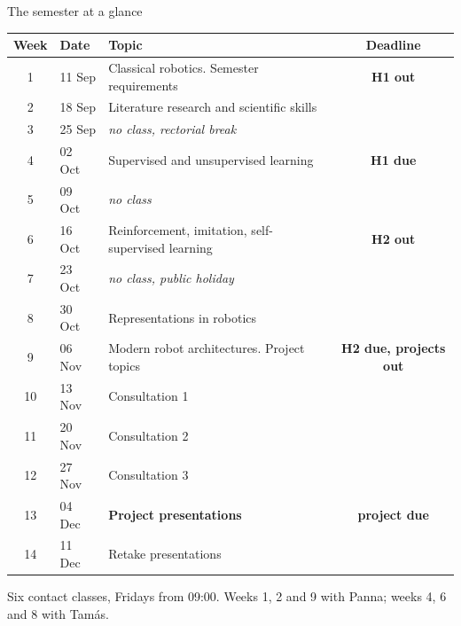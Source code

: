 \documentclass[aspectratio=169]{beamer}
\begin{document}
\begin{frame}{The semester at a glance}
	\begin{center}\scriptsize
	\begin{tabular}{cllc}
		\toprule
		\textbf{Week} & \textbf{Date} & \textbf{Topic} & \textbf{Deadline} \\
		\midrule
		1  & 11 Sep & Classical robotics. Semester requirements & \textbf{H1 out} \\
		2  & 18 Sep & Literature research and scientific skills & \\
		3  & 25 Sep & \textit{no class, rectorial break} & \\
		4  & 02 Oct & Supervised and unsupervised learning & \textbf{H1 due} \\
		5  & 09 Oct & \textit{no class} & \\
		6  & 16 Oct & Reinforcement, imitation, self-supervised learning & \textbf{H2 out} \\
		7  & 23 Oct & \textit{no class, public holiday} & \\
		8  & 30 Oct & Representations in robotics & \\
		9  & 06 Nov & Modern robot architectures. Project topics & \textbf{H2 due, projects out} \\
		10 & 13 Nov & Consultation 1 & \\
		11 & 20 Nov & Consultation 2 & \\
		12 & 27 Nov & Consultation 3 & \\
		13 & 04 Dec & \textbf{Project presentations} & \textbf{project due} \\
		14 & 11 Dec & Retake presentations & \\
		\bottomrule
	\end{tabular}
	\end{center}
	\vspace{1mm}
	\footnotesize Six contact classes, Fridays from 09:00. Weeks 1, 2 and 9 with Panna; weeks 4, 6 and 8 with Tam\'as.
\end{frame}
\end{document}
